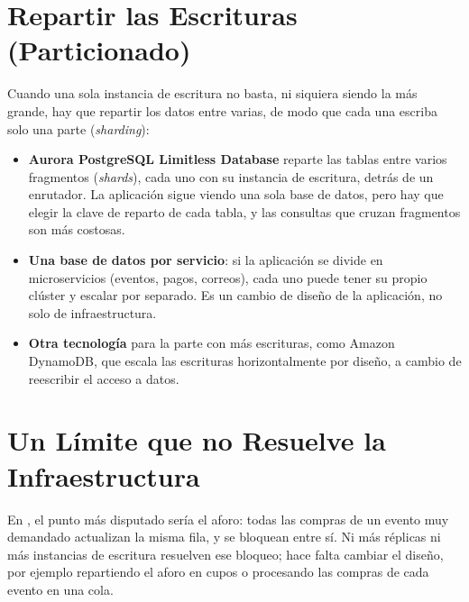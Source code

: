 \documentclass[12pt,a4paper]{article}
\begin{document}
\section{Repartir las Escrituras (Particionado)}

Cuando una sola instancia de escritura no basta, ni siquiera siendo la más grande, hay que repartir los datos entre varias, de modo que cada una escriba solo una parte (\textit{sharding}):

\begin{itemize}
    \item \textbf{Aurora PostgreSQL Limitless Database} reparte las tablas entre varios fragmentos (\textit{shards}), cada uno con su instancia de escritura, detrás de un enrutador. La aplicación sigue viendo una sola base de datos, pero hay que elegir la clave de reparto de cada tabla, y las consultas que cruzan fragmentos son más costosas.
    \item \textbf{Una base de datos por servicio}: si la aplicación se divide en microservicios (eventos, pagos, correos), cada uno puede tener su propio clúster y escalar por separado. Es un cambio de diseño de la aplicación, no solo de infraestructura.
    \item \textbf{Otra tecnología} para la parte con más escrituras, como Amazon DynamoDB, que escala las escrituras horizontalmente por diseño, a cambio de reescribir el acceso a datos.
\end{itemize}

\section{Un Límite que no Resuelve la Infraestructura}

En \proyecto, el punto más disputado sería el aforo: todas las compras de un evento muy demandado actualizan la misma fila, y se bloquean entre sí. Ni más réplicas ni más instancias de escritura resuelven ese bloqueo; hace falta cambiar el diseño, por ejemplo repartiendo el aforo en cupos o procesando las compras de cada evento en una cola.
\end{document}
